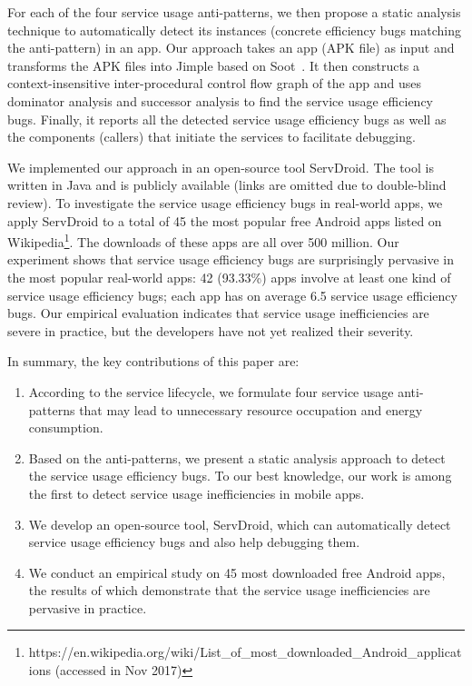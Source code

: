 \documentclass[sigconf,review, anonymous]{acmart}
\begin{document}
For each of the four service usage anti-patterns, we then propose a static
analysis technique to automatically detect its instances (concrete efficiency
bugs matching the anti-pattern) in an app.
Our approach takes an app (APK file) as input and transforms the APK files into
Jimple based on Soot~\cite{sootpaper}. It then constructs a
context-insensitive inter-procedural control flow graph of the app and uses
dominator analysis and successor analysis to find the service usage efficiency
bugs.
Finally, it reports all the
detected service usage efficiency bugs as well as the components (callers) that
initiate the services to facilitate debugging.

We implemented our approach in an open-source tool \textsf{ServDroid}. The tool
is written in Java and is publicly available (links are omitted due to double-blind review).
To investigate the service usage efficiency bugs in real-world apps, we apply
\textsf{ServDroid} to a total of 45 the most popular free Android apps listed on
Wikipedia\footnote{https://en.wikipedia.org/wiki/List\_of\_most\_downloaded\_Android\_applications (accessed in Nov 2017)}.
The downloads of these apps are all over 500 million. Our experiment shows that
service usage efficiency bugs are surprisingly pervasive in the most popular
real-world apps: 42 (93.33\%) apps involve at least one kind of service usage
efficiency bugs; each app has on average 6.5 service usage efficiency bugs.
Our empirical evaluation indicates that service usage inefficiencies are
severe in practice, but the developers have not yet realized their severity.


In summary, the key contributions of this paper are:
\begin{enumerate}
\item According to the service lifecycle, we formulate four service usage
anti-patterns that may lead to unnecessary resource occupation and energy consumption.
\item Based on the anti-patterns, we present a static analysis approach to
detect the service usage efficiency bugs. To our best knowledge, our work
is among the first to detect service usage inefficiencies in mobile apps.
\item We develop an open-source tool, \textsf{ServDroid}, which can
automatically detect service usage efficiency bugs and also help debugging
them.
\item We conduct an empirical study on 45 most downloaded free Android apps,
the results of which demonstrate that the service usage inefficiencies are pervasive in practice.
\end{enumerate}
\end{document}

